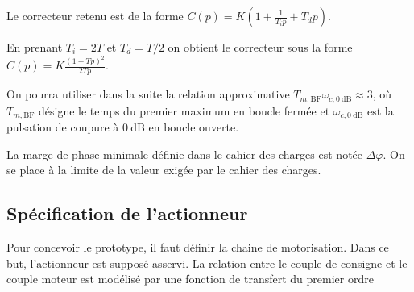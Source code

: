 \ifprof
\begin{corrige}
\end{corrige}
\else
\fi

Le correcteur retenu est de la forme
$
C(p)=K\left(1+\frac{1}{T_{i} p}+T_{d} p\right) .
$

En prenant $T_{i}=2 T$ et $T_{d}=T / 2$ on obtient le correcteur sous la forme
$
C(p)=K \frac{(1+T p)^{2}}{2 T p} .
$

On pourra utiliser dans la suite la relation approximative $T_{m, \mathrm{BF}} \omega_{c, 0 \mathrm{~dB}} \approx 3$, où $T_{m, \mathrm{BF}}$ désigne le temps du premier maximum en boucle fermée et $\omega_{c, 0 \mathrm{~dB}}$ est la pulsation de coupure à $0 \mathrm{~dB}$ en boucle ouverte.

La marge de phase minimale définie dans le cahier des charges est notée $\Delta \varphi$. On se place à la limite de la valeur exigée par le cahier des charges.

\ifprof
\begin{corrige}
\end{corrige}
\else
\fi

\ifprof
\begin{corrige}
\end{corrige}
\else
\fi

\ifprof
\begin{corrige}
\end{corrige}
\else
\fi

\subsection{Spécification de l'actionneur}
Pour concevoir le prototype, il faut définir la chaine de motorisation. Dans ce but, l'actionneur est supposé asservi. La relation entre le couple de consigne et le couple moteur est modélisé par une fonction de transfert du premier ordre


